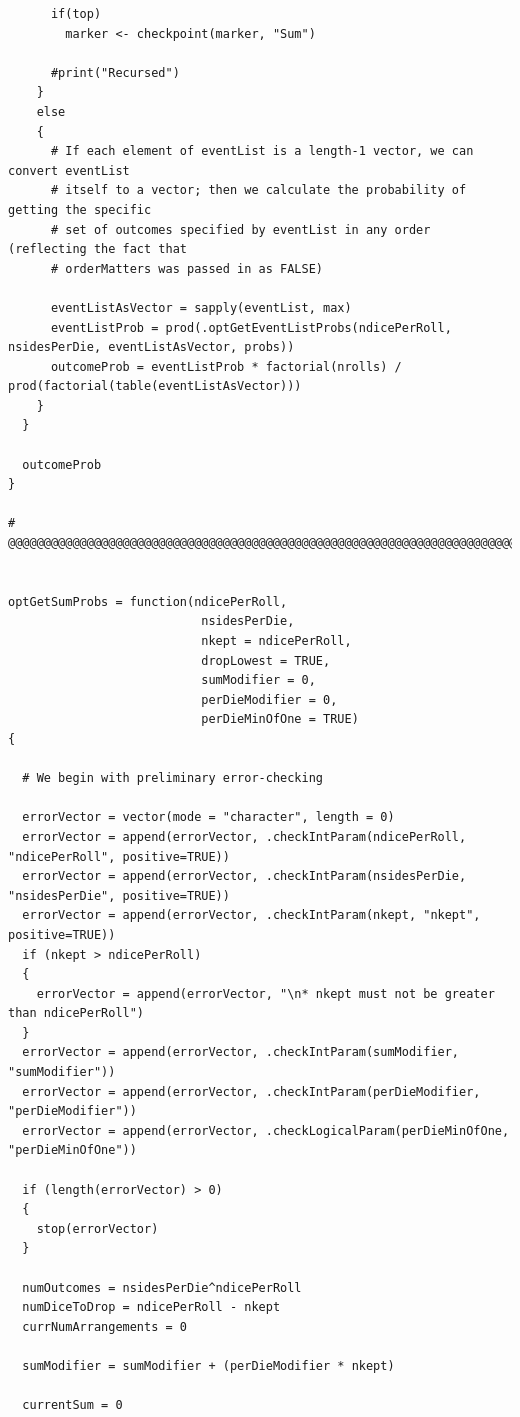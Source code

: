 \documentclass[12pt]{article}
\begin{document}
\begin{lstlisting}
      if(top)
        marker <- checkpoint(marker, "Sum")
      
      #print("Recursed")
    }
    else
    {
      # If each element of eventList is a length-1 vector, we can convert eventList
      # itself to a vector; then we calculate the probability of getting the specific
      # set of outcomes specified by eventList in any order (reflecting the fact that 
      # orderMatters was passed in as FALSE)
      
      eventListAsVector = sapply(eventList, max)
      eventListProb = prod(.optGetEventListProbs(ndicePerRoll, nsidesPerDie, eventListAsVector, probs))
      outcomeProb = eventListProb * factorial(nrolls) / prod(factorial(table(eventListAsVector)))
    }
  }
  
  outcomeProb
}

# @@@@@@@@@@@@@@@@@@@@@@@@@@@@@@@@@@@@@@@@@@@@@@@@@@@@@@@@@@@@@@@@@@@@@@@@@@@@@@@@@@@@


optGetSumProbs = function(ndicePerRoll,
                           nsidesPerDie,
                           nkept = ndicePerRoll,
                           dropLowest = TRUE,
                           sumModifier = 0,
                           perDieModifier = 0,
                           perDieMinOfOne = TRUE)
{
  
  # We begin with preliminary error-checking
  
  errorVector = vector(mode = "character", length = 0)
  errorVector = append(errorVector, .checkIntParam(ndicePerRoll, "ndicePerRoll", positive=TRUE))
  errorVector = append(errorVector, .checkIntParam(nsidesPerDie, "nsidesPerDie", positive=TRUE))
  errorVector = append(errorVector, .checkIntParam(nkept, "nkept", positive=TRUE))
  if (nkept > ndicePerRoll)
  {
    errorVector = append(errorVector, "\n* nkept must not be greater than ndicePerRoll")
  }
  errorVector = append(errorVector, .checkIntParam(sumModifier, "sumModifier"))
  errorVector = append(errorVector, .checkIntParam(perDieModifier, "perDieModifier"))
  errorVector = append(errorVector, .checkLogicalParam(perDieMinOfOne, "perDieMinOfOne"))
  
  if (length(errorVector) > 0)
  {
    stop(errorVector)
  }
  
  numOutcomes = nsidesPerDie^ndicePerRoll
  numDiceToDrop = ndicePerRoll - nkept
  currNumArrangements = 0
  
  sumModifier = sumModifier + (perDieModifier * nkept)
  
  currentSum = 0
  

\end{lstlisting}
\end{document}
